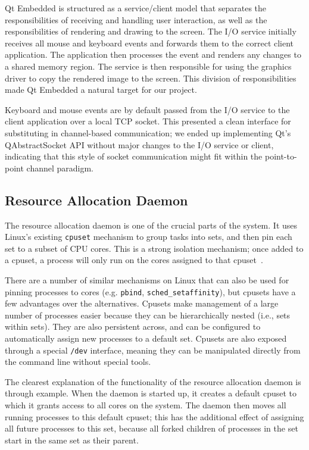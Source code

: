 \documentclass[letterpaper,twocolumn,10pt]{article}
\begin{document}
Qt Embedded is structured as a service/client model that separates the responsibilities of receiving and handling user interaction, as well as the responsibilities of rendering and drawing to the screen. The I/O service initially receives all mouse and keyboard events and forwards them to the correct client application. The application then processes the event and renders any changes to a shared memory region. The service is then responsible for using the graphics driver to copy the rendered image to the screen. This division of responsibilities made Qt Embedded a natural target for our project.

Keyboard and mouse events are by default passed from the I/O service to the client application over a local TCP socket. This presented a clean interface for substituting in channel-based communication; we ended up implementing Qt's QAbstractSocket API without major changes to the I/O service or client, indicating that this style of socket communication might fit within the point-to-point channel paradigm.

\subsection{Resource Allocation Daemon}

The resource allocation daemon is one of the crucial parts of the system. It uses Linux's existing {\tt cpuset} mechanism to group tasks into sets, and then pin each set to a subset of CPU cores. This is a strong isolation mechanism; once added to a cpuset, a process will only run on the cores assigned to that cpuset~\cite{cpusets}.

There are a number of similar mechanisms on Linux that can also be used for pinning processes to cores (e.g. {\tt pbind}, {\tt sched\_setaffinity}), but cpusets have a few advantages over the alternatives. Cpusets make management of a large number of processes easier because they can be hierarchically nested (i.e., sets within sets). They are also persistent across, and can be configured to automatically assign new processes to a default set. Cpusets are also exposed through a special {\tt /dev} interface, meaning they can be manipulated directly from the command line without special tools.

The clearest explanation of the functionality of the resource allocation daemon is through example. When the daemon is started up, it creates a default cpuset to which it grants access to all cores on the system. The daemon then moves all running processes to this default cpuset; this has the additional effect of assigning all future processes to this set, because all forked children of processes in the set start in the same set as their parent.
\end{document}
